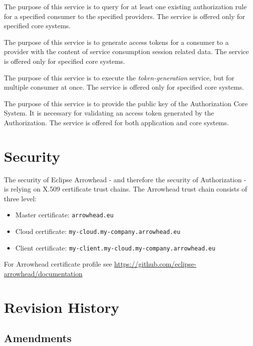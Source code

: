 \documentclass[a4paper]{arrowhead}
\begin{document}
The purpose of this service is to query for at least one existing authorization rule for a specified consumer to the specified providers. The service is offered only for specified core systems.

The purpose of this service is to generate access tokens for a consumer to a provider with the content of service consumption session related data. The service is offered only for specified core systems.

The purpose of this service is to execute the \textit{token-generation} service, but for multiple consumer at once. The service is offered only for specified core systems.

The purpose of this service is to provide the public key of the Authorization Core System. It is necessary for validating an access token generated by the Authorization. The service is offered for both application and core systems. 

\newpage

\section{Security}
\label{sec:security}

The security of Eclipse Arrowhead - and therefore the security of Authorization  - is relying on X.509 certificate trust chains. The Arrowhead trust chain consists of three level:
\begin{itemize}
    \item Master certificate: \texttt{arrowhead.eu}
    \item Cloud certificate: \texttt {my-cloud.my-company.arrowhead.eu}
    \item Client certificate: \texttt{my-client.my-cloud.my-company.arrowhead.eu}
\end{itemize}

For Arrowhead certificate profile see \url{https://github.com/eclipse-arrowhead/documentation}




\newpage

\section{Revision History}
\subsection{Amendments}
\end{document}
